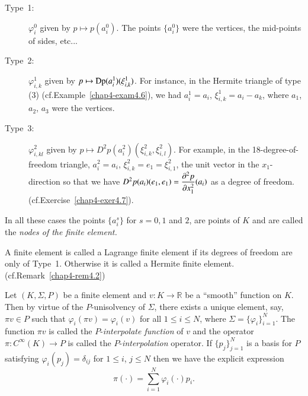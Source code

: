 \begin{description}
\item[Type~1:] $\varphi^{0}_{i}$ given by $p\mapsto p(a^{0}_{i})$. The
  points $\{a^{0}_{i}\}$ were the vertices, the mid-points of sides,
  etc...

\item[Type~2:] $\varphi^{1}_{i,k}$ given by $p\mapsto
  \operatorname{Dp}(a^{1}_{i})(\xi^{1}_{i,k})$. For instance, in the Hermite
  triangle of type (3) (cf.\@ Example~\ref{chap4-exam4.6}), we had
  $a^{1}_{i}=a_{i}$, $\xi^{1}_{i,k}=a_{i}-a_{k}$, where $a_{1}$,
  $a_{2}$, $a_{3}$ were the vertices.

\item[Type~3:] $\varphi^{2}_{i,kl}$ given by $p\mapsto
  D^{2}p(a^{2}_{i})(\xi^{2}_{i,k},\xi^{2}_{i,l})$. For example, in the
  18-degree-of-freedom triangle, $a^{2}_{i}=a_{i}$,
  $\xi^{2}_{i,k}=e_{1}=\xi^{2}_{i,1}$, the unit vector in the
  $x_{1}$-direction so that we have
  $D^{2}p(a_{i})(e_{1},e_{1})=\dfrac{\partial^{2}p}{\partial x^{2}_{1}}(a_{i})$ as
  a degree of freedom. (cf.\@ Exercise~\ref{chap4-exer4.7}).
\end{description}

In all these cases the points $\{a^{s}_{i}\}$ for $s=0,1$ and $2$, are
points of $K$ and are called the {\em nodes of the finite element.}

\begin{definition}\label{chap5-defi5.2}
A finite element is called a Lagrange finite element if its degrees of
freedom are only of Type~1. Otherwise it is called a Hermite finite
element. (cf.\@ Remark~\ref{chap4-rem4.2})
\end{definition}

Let $(K,\Sigma,P)$ be a finite element and $v:K\to \mathbb{R}$ be a
``smooth'' function on $K$. Then by virtue of the $P$-unisolvency of
$\Sigma$, there exists a unique element, say, $\pi v\in P$ such that
$\varphi_{i}(\pi v)=\varphi_{i}(v)$ for all $1\leq i\leq N$, where
$\Sigma=\{\varphi_{i}\}^{N}_{i=1}$. The function $\pi v$ is called the
$P$-{\em interpolate function} of $v$ and the operator
$\pi:C^{\infty}(K)\to P$ is called the $P$-{\em interpolation}
operator. If $\{p_{j}\}^{N}_{j=1}$ is a basis for $P$ satisfying
$\varphi_{i}(p_{j})=\delta_{ij}$ for $1\leq i$, $j\leq N$ then we have
the explicit expression
\begin{equation*}
\pi(\cdot)=\sum^{N}_{i=1}\varphi_{i}(\cdot)p_{i}.\tag{5.3}\label{chap5-eq5.3}
\end{equation*}

